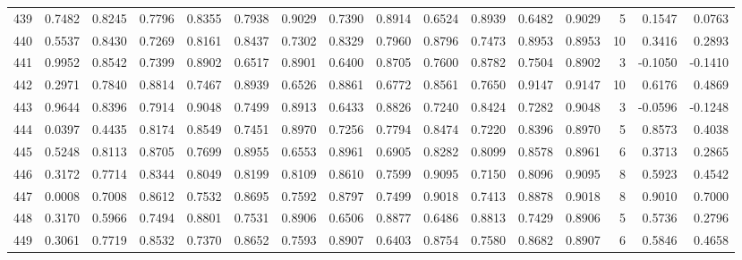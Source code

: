 \begin{tabular}{lrrrrrrrrrrrrrrr}
439 &      0.7482 &  0.8245 &  0.7796 &  0.8355 &  0.7938 &  0.9029 &  0.7390 &  0.8914 &  0.6524 &  0.8939 &   0.6482 &     0.9029 &      5 &                    0.1547 &                     0.0763 \\
440 &      0.5537 &  0.8430 &  0.7269 &  0.8161 &  0.8437 &  0.7302 &  0.8329 &  0.7960 &  0.8796 &  0.7473 &   0.8953 &     0.8953 &     10 &                    0.3416 &                     0.2893 \\
441 &      0.9952 &  0.8542 &  0.7399 &  0.8902 &  0.6517 &  0.8901 &  0.6400 &  0.8705 &  0.7600 &  0.8782 &   0.7504 &     0.8902 &      3 &                   -0.1050 &                    -0.1410 \\
442 &      0.2971 &  0.7840 &  0.8814 &  0.7467 &  0.8939 &  0.6526 &  0.8861 &  0.6772 &  0.8561 &  0.7650 &   0.9147 &     0.9147 &     10 &                    0.6176 &                     0.4869 \\
443 &      0.9644 &  0.8396 &  0.7914 &  0.9048 &  0.7499 &  0.8913 &  0.6433 &  0.8826 &  0.7240 &  0.8424 &   0.7282 &     0.9048 &      3 &                   -0.0596 &                    -0.1248 \\
444 &      0.0397 &  0.4435 &  0.8174 &  0.8549 &  0.7451 &  0.8970 &  0.7256 &  0.7794 &  0.8474 &  0.7220 &   0.8396 &     0.8970 &      5 &                    0.8573 &                     0.4038 \\
445 &      0.5248 &  0.8113 &  0.8705 &  0.7699 &  0.8955 &  0.6553 &  0.8961 &  0.6905 &  0.8282 &  0.8099 &   0.8578 &     0.8961 &      6 &                    0.3713 &                     0.2865 \\
446 &      0.3172 &  0.7714 &  0.8344 &  0.8049 &  0.8199 &  0.8109 &  0.8610 &  0.7599 &  0.9095 &  0.7150 &   0.8096 &     0.9095 &      8 &                    0.5923 &                     0.4542 \\
447 &      0.0008 &  0.7008 &  0.8612 &  0.7532 &  0.8695 &  0.7592 &  0.8797 &  0.7499 &  0.9018 &  0.7413 &   0.8878 &     0.9018 &      8 &                    0.9010 &                     0.7000 \\
448 &      0.3170 &  0.5966 &  0.7494 &  0.8801 &  0.7531 &  0.8906 &  0.6506 &  0.8877 &  0.6486 &  0.8813 &   0.7429 &     0.8906 &      5 &                    0.5736 &                     0.2796 \\
449 &      0.3061 &  0.7719 &  0.8532 &  0.7370 &  0.8652 &  0.7593 &  0.8907 &  0.6403 &  0.8754 &  0.7580 &   0.8682 &     0.8907 &      6 &                    0.5846 &                     0.4658 \\

\end{tabular}
